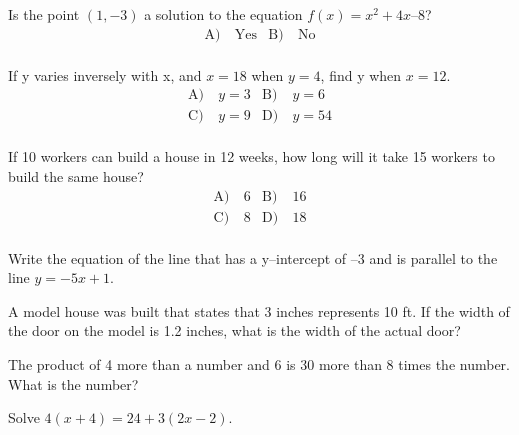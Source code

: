 \begin{problem}\label{Alg32}
Is the point $(1,-3)$ a solution to the equation  $f(x) = x^2 +4x – 8$?
\begin{align*}
\text{A)}\ & \text{Yes} &
\text{B)}\ & \text{No}\\
\end{align*} 
\end{problem}


\begin{problem}\label{Alg33}
 If y varies inversely with x, and $x = 18$ when $y = 4$, find y when $x = 12$.
\begin{align*}
\text{A)}\ & y=3  &
\text{B)}\ & y=6\\
\text{C)}\ &  y=9 &
\text{D)}\ & y=54 \\
\end{align*} 
\end{problem}




\begin{problem}\label{Alg34}
 If 10 workers can build a house in 12 weeks, how long will it take 15 workers to build the same house?
\begin{align*}
\text{A)}\ &6  &
\text{B)}\ & 16\\
\text{C)}\ &  8 &
\text{D)}\ & 18\\
\end{align*} 
\end{problem}



\begin{problem}\label{Alg35}
Write the equation of the line that has a y–intercept of –3 and is parallel to the line $y = -5x +1$. 
\end{problem}



\begin{problem}\label{Alg36}
A model house was built that states that 3 inches represents 10 ft.  If the width of the door on the model is 1.2 inches, what is the width of the actual door?
\end{problem}


\begin{problem}\label{Alg37}
The product of 4 more than a number and 6 is 30 more than 8 times the number.  What is the number?
\end{problem}



\begin{problem}\label{Alg39}
Solve $4(x+4)=24+3(2x-2)$.
\end{problem}
 

